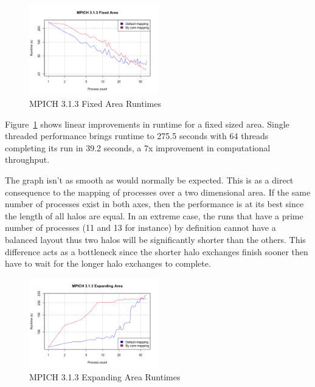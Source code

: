 \begin{figure}
    \includegraphics[width=0.5\textwidth]{graphs/MPICH313-fixed-area.png}
    \caption{MPICH 3.1.3 Fixed Area Runtimes}
    \label{fig:mpichdfixedarea}
\end{figure}

Figure~\ref{fig:mpichdfixedarea} shows linear improvements in runtime for a
fixed sized area. Single threaded performance brings runtime to 275.5 seconds
with 64 threads completing its run in 39.2 seconds, a 7x improvement in
computational throughput.

The graph isn't as smooth as would normally be expected. This is as a direct
consequence to the mapping of processes over a two dimensional area. If the same
number of processes exist in both axes, then the performance is at its best
since the length of all halos are equal. In an extreme case, the runs that have
a prime number of processes (11 and 13 for instance) by definition cannot have a
balanced layout thus two halos will be significantly shorter than the others.
This difference acts as a bottleneck since the shorter halo exchanges finish
sooner then have to wait for the longer halo exchanges to complete.

\begin{figure}
    \includegraphics[width=0.5\textwidth]{graphs/MPICH313-expanding-area.png}
    \caption{MPICH 3.1.3 Expanding Area Runtimes}
    \label{fig:mpichexpandingarea}
\end{figure}

